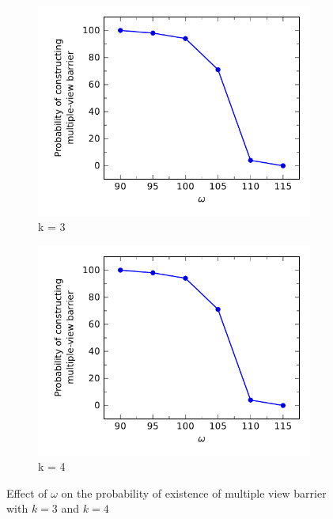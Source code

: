 %
\begin{figure}[h]
	\begin{subfigure}[t]{.5\textwidth}
		\centering
		\includegraphics[scale=.8]{Hinhanh/OmegaEffect/probability/k3.pdf}		
		\caption{k = 3}
	\end{subfigure}
	\begin{subfigure}[t]{.5\textwidth}
		\centering
		\includegraphics[scale=.8]{Hinhanh/OmegaEffect/probability/k3.pdf}		
		\caption{k = 4}
	\end{subfigure}
\caption{Effect of $\omega$ on the probability of existence of multiple view barrier with $k = 3$ and $k = 4$}
\label{fig:}
\end{figure}

